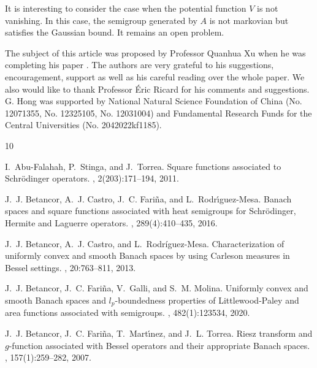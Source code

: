\documentclass[oneside,english,a4wide]{amsart}
\numberwithin{equation}{section}
\numberwithin{figure}{section}
\theoremstyle{plain}
\theoremstyle{plain}
\theoremstyle{definition}
\theoremstyle{plain}
\theoremstyle{remark}
\theoremstyle{definition}
\theoremstyle{remark}
\theoremstyle{definition}
\newcommand{\8}{+\infty}
\renewcommand{\1}{\mathbbm{1}}
\begin{document}
{It is interesting to consider the case when the potential function $V$ is not vanishing. In this case, the semigroup generated by $A$ is not markovian but satisfies the Gaussian bound. It remains an open problem.

\fi

The subject of this article was proposed by Professor Quanhua Xu when he was completing his paper \cite{Xu2021}. The authors are very grateful to his suggestions, encouragement, support as well as his careful reading over the whole paper. We also would like to thank Professor \'{E}ric Ricard for his comments and suggestions.
G. Hong was supported by National Natural Science Foundation of China (No. 12071355, No. 12325105, No. 12031004) and Fundamental Research Funds for the Central Universities (No. 2042022kf1185).
\bigskip
	

\begin{thebibliography}{10}

    I.~Abu-Falahah, P.~Stinga, and J.~Torrea.
    \newblock Square functions associated to {S}chr{\"o}dinger operators.
    , 2(203):171--194, 2011.
    
    J.~J. Betancor, A.~J. Castro, J.~C. Fari{\~n}a, and L.~Rodr{\'\i}guez-Mesa.
     {B}anach spaces and square functions associated with heat
      semigroups for {S}chr{\"o}dinger, {H}ermite and {L}aguerre operators.
    , 289(4):410--435, 2016.
    
    J.~J. Betancor, A.~J. Castro, and L.~Rodr{\'i}guez-Mesa.
    \newblock Characterization of uniformly convex and smooth {B}anach spaces by
      using {C}arleson measures in {B}essel settings.
    , 20:763--811, 2013.
    
    J.~J. Betancor, J.~C. Fari{\~n}a, V.~Galli, and S.~M. Molina.
    \newblock Uniformly convex and smooth {B}anach spaces and $l_p$-boundedness
      properties of {L}ittlewood-{P}aley and area functions associated with
      semigroups.
    , 482(1):123534, 2020.
    
    J.~J. Betancor, J.~C. Fari{\~n}a, T.~Mart{\'\i}nez, and J.~L. Torrea.
    \newblock Riesz transform and $g$-function associated with {B}essel operators
      and their appropriate {B}anach spaces.
    , 157(1):259--282, 2007.
    

\end{thebibliography}}
\end{document}
